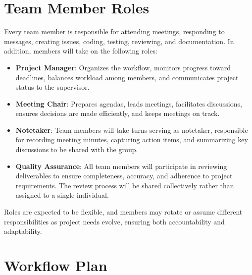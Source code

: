 \documentclass{article}
\begin{document}
\section{Team Member Roles}


Every team member is responsible for attending meetings, responding to messages, creating issues, coding, testing, 
reviewing, and documentation. In addition, members will take on the following roles:

\begin{itemize}
  \item \textbf{Project Manager}: Organizes the workflow, monitors progress toward deadlines, balances workload among members, and communicates project status to the supervisor.
  
  \item \textbf{Meeting Chair}: Prepares agendas, leads meetings, facilitates discussions, ensures decisions are made efficiently, and keeps meetings on track.
  
  \item \textbf{Notetaker}: Team members will take turns serving as notetaker, responsible for recording meeting minutes, capturing action items, and summarizing key discussions to be shared with the group.
  
  \item \textbf{Quality Assurance}: All team members will participate in reviewing deliverables to ensure completeness, accuracy, and adherence to project requirements. The review process will be shared collectively rather than assigned to a single individual.
\end{itemize}

\noindent
Roles are expected to be flexible, and members may rotate or assume different responsibilities as project needs evolve, ensuring both accountability and adaptability.

\section{Workflow Plan}

\end{document}
